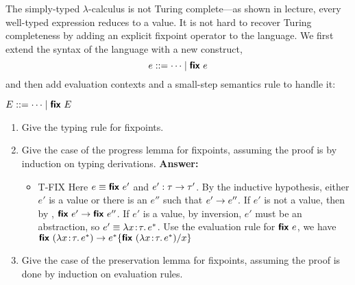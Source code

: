 \documentclass[11pt]{article}
\begin{document}
\begin{exercise}
The simply-typed $\lambda$-calculus is not Turing complete---as shown
in lecture, every well-typed expression reduces to a value. It is not
hard to recover Turing completeness by adding an explicit fixpoint
operator to the language. We first extend the syntax of the language
with a new construct,
\[
e ::= \dots \mid \textsf{\textbf{fix}}~e\\
\]
and then add evaluation contexts and a small-step semantics rule to
handle it:
\begin{center}
$E ::= \dots \mid \textsf{\textbf{fix}}~E$

\end{center}

\begin{enumerate}
\item Give the typing rule for fixpoints.
\item Give the case of the progress lemma for fixpoints, assuming the proof is by induction on typing derivations.
\newline
\newline
\textbf{Answer:}
	\begin{itemize}
		\item T-FIX \newline
		Here $e \equiv \typ{fix}\ e'$ and $e':\tau \rightarrow \tau'$. By the inductive hypothesis, either $e'$ is a value
		or there is an $e''$ such that $e' \rightarrow e''$.
		\newline
		If $e'$ is not a value, then by , $\textsf{\textbf{fix}}\ e' \rightarrow \textsf{\textbf{fix}}\ e''$. If $e'$ is a
		value, by inversion, $e'$ must be an abstraction, so $e' \equiv \lambda x\!:\!\tau.\,e^{\ast}$. 
		Use the evaluation rule for $\textsf{\textbf{fix}}\ e$, we have $\textsf{\textbf{fix}}~(\lambda x\!:\!\tau.\,e^{\ast}) \rightarrow
		 e^{\ast}\{\textsf{\textbf{fix}}~(\lambda x\!:\!\tau.\,e^{\ast}) / x\}$
	\end{itemize}
\item Give the case of the preservation lemma for fixpoints, assuming the proof is done by induction on evaluation rules.
\end{enumerate}

\end{exercise}
\end{document}
